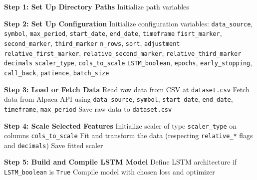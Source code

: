 \documentclass[letterpaper]{article}
\begin{document}
\begin{algorithm}[H]
\caption{LSTM Model Training and Saving Pipeline}
\label{alg:lstm_pipeline}
\begin{algorithmic}[1]
    \State \textbf{Step 1: Set Up Directory Paths}
    \State \hspace{1em} Initialize path variables

    \State \textbf{Step 2: Set Up Configuration}
    \State \hspace{1em} Initialize configuration variables:
    \Statex \hspace{2em}\texttt{data\_source}, \texttt{symbol}, \texttt{max\_period}, \texttt{start\_date}, \texttt{end\_date}, \texttt{timeframe}
    \Statex \hspace{2em}\texttt{fisrt\_marker}, \texttt{second\_marker}, \texttt{third\_marker}
    \Statex \hspace{2em}\texttt{n\_rows}, \texttt{sort}, \texttt{adjustment}
    \Statex \hspace{2em}\texttt{relative\_first\_marker}, \texttt{relative\_second\_marker}, \texttt{relative\_third\_marker}
    \Statex \hspace{2em}\texttt{decimals}
    \Statex \hspace{2em}\texttt{scaler\_type}, \texttt{cols\_to\_scale}
    \Statex \hspace{2em}\texttt{LSTM\_boolean}, \texttt{epochs}, \texttt{early\_stopping}, \texttt{call\_back}, \texttt{patience}, \texttt{batch\_size}

    \State \textbf{Step 3: Load or Fetch Data}
        \State Read raw data from CSV at \texttt{dataset.csv}
    \Else
        \State Fetch data from Alpaca API using \texttt{data\_source}, \texttt{symbol}, \texttt{start\_date}, \texttt{end\_date}, \texttt{timeframe}, \texttt{max\_period}
        \State Save raw data to \texttt{dataset.csv}
    \EndIf

    \State \textbf{Step 4: Scale Selected Features}
    \State \hspace{1em} Initialize scaler of type \texttt{scaler\_type} on columns \texttt{cols\_to\_scale}
    \State \hspace{1em} Fit and transform the data (respecting \texttt{relative\_*} flags and \texttt{decimals})
    \State \hspace{1em} Save fitted scaler

    \State \textbf{Step 5: Build and Compile LSTM Model}
    \State \hspace{1em} Define LSTM architecture if \texttt{LSTM\_boolean} is \texttt{True}
    \State \hspace{1em} Compile model with chosen loss and optimizer


\end{algorithmic}
\end{algorithm}
\end{document}
